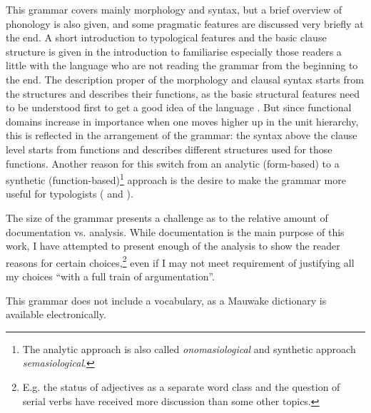 This grammar covers mainly morphology and syntax, but a brief overview of phonology is also given, and some pragmatic features are discussed very briefly at the end. A short introduction to typological features and the basic clause structure is given in the introduction to familiarise especially those readers a little with the language who are not reading the grammar from the beginning to the end. The description proper of  the morphology and clausal syntax starts from the structures and describes their functions, as the basic structural features need to be understood first to get a good idea of the language \citep[59]{Mosel2006}. But since functional domains increase in importance when one moves higher up in the unit hierarchy, this is reflected in the arrangement of the grammar: the syntax above the clause level starts from functions and describes different structures used for those functions. Another reason for this switch from an analytic (form-based) to a synthetic (function-based)\footnote{The analytic approach is also called \textit{onomasiological} and synthetic approach \textit{semasiological}.}  approach is the desire to make the grammar more useful for typologists (\citealt{Cristofaro2006} and \citealt[15]{EvansEtAl2006}). 

The size of the grammar presents a challenge as to the relative amount of documentation vs. analysis.  While documentation is the main purpose of this work, I have attempted to present enough of the analysis to show the reader reasons for certain choices,\footnote{E.g. the status of adjectives as a separate word class and the question of serial verbs have received more discussion than some other topics.} even if I may not meet  requirement of justifying all my choices ``with a full train of argumentation''.


This grammar does not include a vocabulary, as a Mauwake dictionary \citep{JarvinenEtAl2001} is available electronically.




